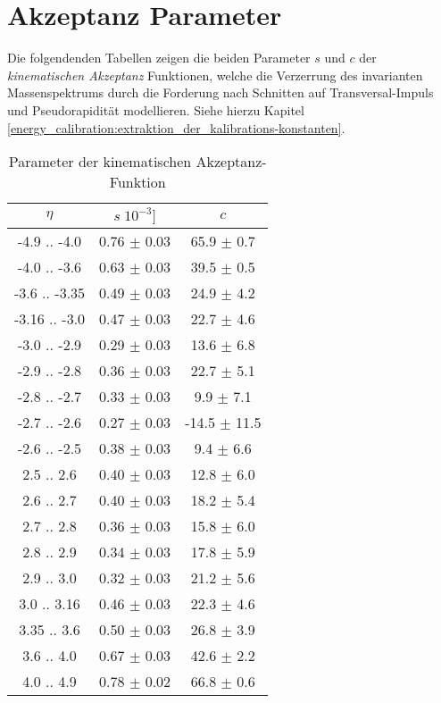 


\chapter{Akzeptanz Parameter}
Die folgendenden Tabellen zeigen die beiden Parameter $s$ und $c$ der
\textit{kinematischen Akzeptanz} Funktionen, welche die Verzerrung des
invarianten Massenspektrums durch die Forderung nach Schnitten auf
Transversal-Impuls und Pseudorapidität modellieren. Siehe hierzu Kapitel
\ref{energy_calibration:extraktion_der_kalibrations-konstanten}.
\begin{table}[hb]
    \centering
    \begin{tabular}{|c|c|c|}
        \hline
        $\eta$ & $s \; 10^{-3}]$ & $c$  \\
        \hline \hline
        -4.9  .. -4.0  & 0.76 $\pm$ 0.03 &  65.9 $\pm$  0.7 \\
        -4.0  .. -3.6  & 0.63 $\pm$ 0.03 &  39.5 $\pm$  0.5 \\
        -3.6  .. -3.35 & 0.49 $\pm$ 0.03 &  24.9 $\pm$  4.2 \\
        -3.16 .. -3.0  & 0.47 $\pm$ 0.03 &  22.7 $\pm$  4.6 \\
        -3.0  .. -2.9  & 0.29 $\pm$ 0.03 &  13.6 $\pm$  6.8 \\
        -2.9  .. -2.8  & 0.36 $\pm$ 0.03 &  22.7 $\pm$  5.1 \\
        -2.8  .. -2.7  & 0.33 $\pm$ 0.03 &   9.9 $\pm$  7.1 \\
        -2.7  .. -2.6  & 0.27 $\pm$ 0.03 & -14.5 $\pm$ 11.5 \\
        -2.6  .. -2.5  & 0.38 $\pm$ 0.03 &   9.4 $\pm$  6.6 \\
        \hline\hline
         2.5  ..  2.6  & 0.40 $\pm$ 0.03 &  12.8 $\pm$  6.0 \\
         2.6  ..  2.7  & 0.40 $\pm$ 0.03 &  18.2 $\pm$  5.4 \\
         2.7  ..  2.8  & 0.36 $\pm$ 0.03 &  15.8 $\pm$  6.0 \\
         2.8  ..  2.9  & 0.34 $\pm$ 0.03 &  17.8 $\pm$  5.9 \\
         2.9  ..  3.0  & 0.32 $\pm$ 0.03 &  21.2 $\pm$  5.6 \\
         3.0  ..  3.16 & 0.46 $\pm$ 0.03 &  22.3 $\pm$  4.6 \\
         3.35 ..  3.6  & 0.50 $\pm$ 0.03 &  26.8 $\pm$  3.9 \\
         3.6  ..  4.0  & 0.67 $\pm$ 0.03 &  42.6 $\pm$  2.2 \\
         4.0  ..  4.9  & 0.78 $\pm$ 0.02 &  66.8 $\pm$  0.6 \\
         \hline
    \end{tabular}
    \caption{Parameter der kinematischen Akzeptanz-Funktion}
    \label{tab:acceptance_parameters}
\end{table}

